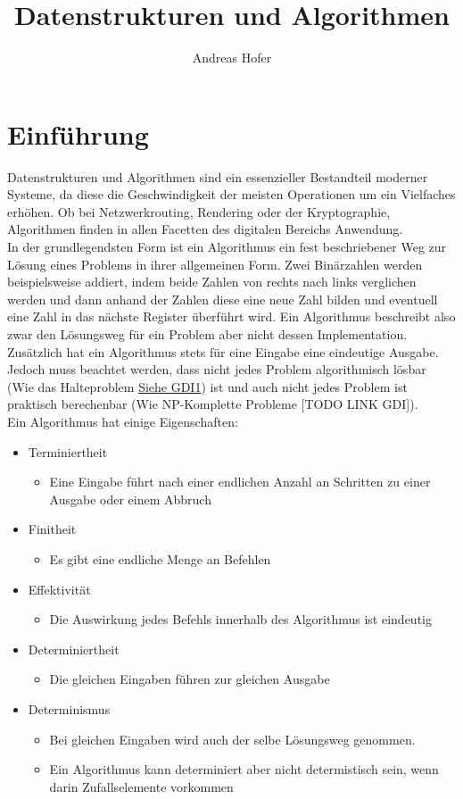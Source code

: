 \documentclass{article}
\title{\vspace{-1cm}Datenstrukturen und Algorithmen}
\author{Andreas Hofer}
\begin{document}
	\maketitle
	\tableofcontents
	\section{Einführung}
	Datenstrukturen und Algorithmen sind ein essenzieller Bestandteil moderner Systeme, da diese die Geschwindigkeit der meisten Operationen um ein Vielfaches erhöhen. Ob bei Netzwerkrouting, Rendering oder der Kryptographie, Algorithmen finden in allen Facetten des digitalen Bereichs Anwendung. \\
	In der grundlegendsten Form ist ein Algorithmus ein fest beschriebener Weg zur Lösung eines Problems in ihrer allgemeinen Form. Zwei Binärzahlen werden beispielsweise addiert, indem beide Zahlen von rechts nach links verglichen werden und dann anhand der Zahlen diese eine neue Zahl bilden und eventuell eine Zahl in das nächste Register überführt wird. Ein Algorithmus beschreibt also zwar den Lösungsweg für ein Problem aber nicht dessen Implementation. Zusätzlich hat ein Algorithmus stets für eine Eingabe eine eindeutige Ausgabe. \\
	Jedoch muss beachtet werden, dass nicht jedes Problem algorithmisch lösbar (Wie das Halteproblem \hyperref{/../Semester 1/GDI1/GDI.pdf}{halteproblem1}{halteproblem2}{Siehe GDI1}) ist und auch nicht jedes Problem ist praktisch berechenbar (Wie NP-Komplette Probleme [TODO LINK GDI]). \\
	Ein Algorithmus hat einige Eigenschaften:
	\begin{itemize}
		\item{Terminiertheit}
		\begin{itemize}
			\item{Eine Eingabe führt nach einer endlichen Anzahl an Schritten zu einer Ausgabe oder einem Abbruch}
		\end{itemize}
		\item{Finitheit}
		\begin{itemize}
			\item{Es gibt eine endliche Menge an Befehlen}
		\end{itemize}
		\item{Effektivität}
		\begin{itemize}
			\item{Die Auswirkung jedes Befehls innerhalb des Algorithmus ist eindeutig}
		\end{itemize}
		\item{Determiniertheit}
		\begin{itemize}
			\item{Die gleichen Eingaben führen zur gleichen Ausgabe}
		\end{itemize}
		\item{Determinismus}
		\begin{itemize}
			\item{Bei gleichen Eingaben wird auch der selbe Lösungsweg genommen.}
			\item{Ein Algorithmus kann determiniert aber nicht determistisch sein, wenn darin Zufallselemente vorkommen}
		\end{itemize}
	\end{itemize}
\end{document}
